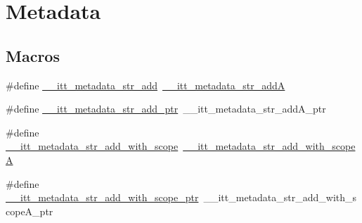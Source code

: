 \hypertarget{group__metadata}{\section{Metadata}
\label{group__metadata}
}
\subsection*{Macros}
\begin{DoxyCompactItemize}
\item 
\#define \hyperlink{group__metadata_gabd5fb0265c614e638f36fb465c372e8d}{\-\_\-\-\_\-itt\-\_\-metadata\-\_\-str\-\_\-add}~\hyperlink{group__metadata_ga1c0cbd4717ce08bf6a83fc84bf0a58e2}{\-\_\-\-\_\-itt\-\_\-metadata\-\_\-str\-\_\-add\-A}
\item 
\#define \hyperlink{group__metadata_ga8ebe7302eaf9f291ede62e0f49c846ce}{\-\_\-\-\_\-itt\-\_\-metadata\-\_\-str\-\_\-add\-\_\-ptr}~\-\_\-\-\_\-itt\-\_\-metadata\-\_\-str\-\_\-add\-A\-\_\-ptr
\item 
\#define \hyperlink{group__metadata_gad1d57296dfdaf252ba36eedc7954bd20}{\-\_\-\-\_\-itt\-\_\-metadata\-\_\-str\-\_\-add\-\_\-with\-\_\-scope}~\hyperlink{group__metadata_ga4c53d5ec2eebfd017f3867239750a0ec}{\-\_\-\-\_\-itt\-\_\-metadata\-\_\-str\-\_\-add\-\_\-with\-\_\-scope\-A}
\item 
\#define \hyperlink{group__metadata_gab7da5c687a7bd71d3206bfb1bfcf0e91}{\-\_\-\-\_\-itt\-\_\-metadata\-\_\-str\-\_\-add\-\_\-with\-\_\-scope\-\_\-ptr}~\-\_\-\-\_\-itt\-\_\-metadata\-\_\-str\-\_\-add\-\_\-with\-\_\-scope\-A\-\_\-ptr
\end{DoxyCompactItemize}
